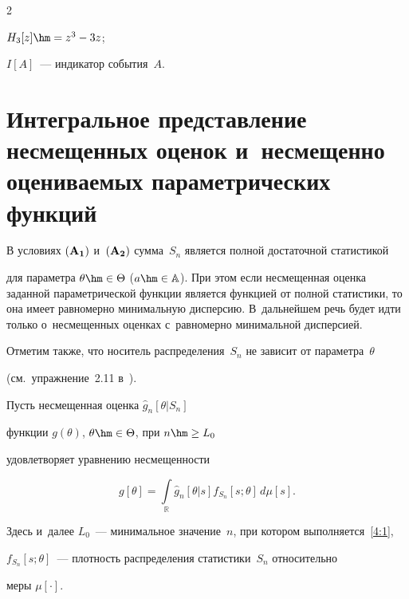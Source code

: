 \begin{multicols}{2}
\begin{description}
 $H_3[z]\hm=z^3-3z$;


\item[\,]


 $I[A]$~--- индикатор события~$A$.


 \end{description}





\section{Интегральное представление несмещенных оценок и~несмещенно оцениваемых параметрических функций}





 В условиях $\bf (A_1)$ и~$\bf(A_2)$ сумма~$S_n$ является полной достаточной статистикой


 для параметра $\theta\hm\in \Theta$ ($a\hm\in \mathbb {A}$). При этом если несмещенная оценка заданной параметрической функции является функцией от полной статистики, то она имеет равномерно минимальную дисперсию. В~дальнейшем речь будет идти только о~несмещенных оценках с~равномерно минимальной дисперсией.


 Отметим также, что носитель распределения~$S_n$ не зависит от параметра~$\theta$


 (см.\ упражнение~2.11 в~\cite{15-ch}).





 Пусть несмещенная оценка $\widehat{g}_n\left[\theta|S_n\right]$


 функции  $g(\theta)$, $\theta\hm\in \Theta$, при $n\hm\ge L_0$


 удовлетворяет уравнению несмещенности


  \begin{equation}


  g[\theta]=\int\limits_{\mathbb{R}} \widehat{g}_n[\theta|s] f_{S_n}[s;\theta] \,d\mu[s].


   \label{4:1}


  \end{equation}


 Здесь и~далее $L_0$~--- минимальное значение~$n$, при котором выполняется~\eqref{4:1},


 $f_{S_n}[s;\theta]$~--- плотность распределения статистики~$S_n$ относительно


 меры $\mu[\cdot]$.






\end{multicols}
